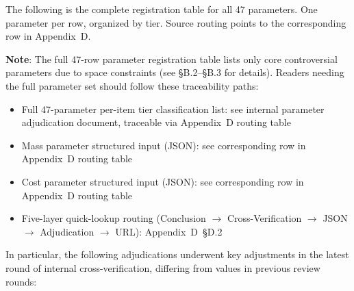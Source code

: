 The following is the complete registration table for all 47 parameters. One parameter per row, organized by tier. Source routing points to the corresponding row in Appendix~D.

\textbf{Note}: The full 47-row parameter registration table lists only core controversial parameters due to space constraints (see \S B.2--\S B.3 for details). Readers needing the full parameter set should follow these traceability paths:

\begin{itemize}
  \item Full 47-parameter per-item tier classification list: see internal parameter adjudication document, traceable via Appendix~D routing table
  \item Mass parameter structured input (JSON): see corresponding row in Appendix~D routing table
  \item Cost parameter structured input (JSON): see corresponding row in Appendix~D routing table
  \item Five-layer quick-lookup routing (Conclusion $\to$ Cross-Verification $\to$ JSON $\to$ Adjudication $\to$ URL): Appendix~D~\S D.2
\end{itemize}

In particular, the following adjudications underwent key adjustments in the latest round of internal cross-verification, differing from values in previous review rounds:

